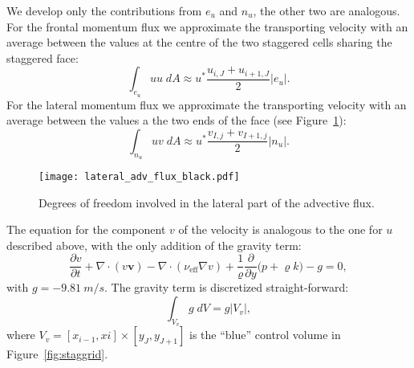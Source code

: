 \begin{itemize}
	We develop only the contributions from $e_u$ and $n_u$, the other two are 
	analogous.\\
	For the frontal momentum flux we approximate the transporting velocity with 
	an average between the values at the centre of the two staggered cells 
	sharing the staggered face:
	\begin{equation}
		\int_{e_u} u u \; dA \approx u^* \frac{u_{i,J} + 
		u_{i+1,J}}{2}|e_u|.
	\end{equation}
	For the lateral momentum flux we approximate the transporting velocity with 
	an average between the values a the two ends of the face (see 
	Figure~\ref{fig:lat_adv_flux}):
	\begin{equation}
	\int_{n_u} u v \; dA \approx u^* \frac{v_{I,j} 
	+v_{I+1,j}}{2} |n_u|.
	\end{equation}
	\begin{figure}
		\centering
		\texttt{[image: lateral\_adv\_flux\_black.pdf]}
		\caption[Degrees of freedom involved in the lateral part of the 
		advective flux]{Degrees of freedom involved in the lateral part of the 
		advective flux.}
		\label{fig:lat_adv_flux}
	\end{figure}
\end{itemize}
The equation for the component $v$ of the velocity is analogous to the one for 
$u$ described above, with the only addition of the gravity term:
\begin{equation}
\frac{\partial v}{\partial t} + \nabla \cdot (v \mathbf{v}) - \nabla \cdot 
(\nu_\text{eff} \nabla v) + \frac{1}{\varrho}\frac{\partial}{\partial y} \big(p 
+ \varrho k\big) - g= 0,
\end{equation}
with $g = \SI{-9.81}{m/s}$. The gravity term is discretized straight-forward:
\begin{equation}
\int_{V_v} g \; dV = g |V_v|,
\end{equation}
where $V_v = [x_{i-1}, xi] \times [y_J, y_{J+1}]$ is the ``blue'' control 
volume in 
Figure~\ref{fig:staggrid}. 

%
